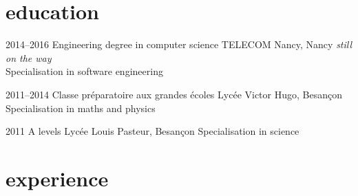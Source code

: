 \documentclass[]{lemaki-cv}
\begin{document}

		\section{education}

		\begin{entrylist}


			\entry
			{2014--2016}
			{Engineering degree {\normalfont in computer science}}
			{TELECOM Nancy, Nancy}
			{\emph{still on the way} \\
			Specialisation in software engineering}


			\entry
			{2011--2014}
			{Classe préparatoire aux grandes écoles}
			{Lycée Victor Hugo, Besançon}
			{Specialisation in maths and physics}


			\entry
			{2011}
			{A levels}
			{Lycée Louis Pasteur, Besançon}
			{Specialisation in science}


		\end{entrylist}


		\section{experience}
\end{document}
